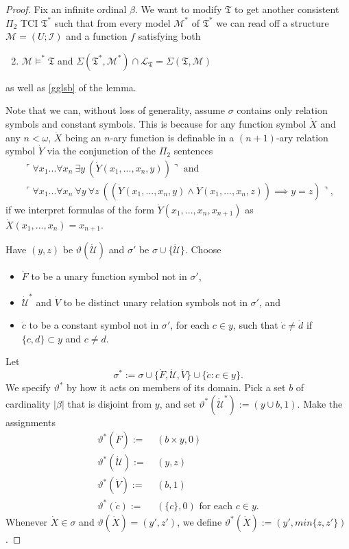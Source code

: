\documentclass[12pt]{article}
\numberwithin{equation}{section}
\begin{document}
\begin{proof}
Fix an infinite ordinal $\beta$. We want to modify $\mathfrak{T}$ to get another consistent $\Pi_2$ TCI $\mathfrak{T}^*$ such that from every model $\mathcal{M}^*$ of $\mathfrak{T}^*$ we can read off a structure $\mathcal{M} = (U; \mathcal{I})$ and a function $f$ satisfying both
\begin{enumerate}[label=(\alph*)']
    \setcounter{enumi}{1}
    \item\label{gglsb'} $\mathcal{M} \models^* \mathfrak{T}$ and $\Sigma(\mathfrak{T}^*, \mathcal{M}^*) \cap \mathcal{L}_{\mathfrak{T}} = \Sigma(\mathfrak{T}, \mathcal{M})$
\end{enumerate}
as well as \ref{gglsb} of the lemma. 

Note that we can, without loss of generality, assume $\sigma$ contains only relation symbols and constant symbols. This is because for any function symbol $\dot{X}$ and any $n < \omega$, $\dot{X}$ being an $n$-ary function is definable in a $(n+1)$-ary relation symbol $\dot{Y}$ via the conjunction of the $\Pi_2$ sentences
\begin{gather*}
    \ulcorner \forall x_1 ... \forall x_n \ \exists y \ (\dot{Y}(x_1, ..., x_n, y)) \urcorner \text{ and} \\
    \ulcorner \forall x_1 ... \forall x_n \ \forall y \ \forall z \ ((\dot{Y} (x_1, ..., x_n, y) \wedge \dot{Y} (x_1, ..., x_n, z)) \implies y = z) \urcorner \text{,} 
\end{gather*}
if we interpret formulas of the form $\dot{Y} (x_1, ..., x_n, x_{n+1})$ as $\dot{X} (x_1, ..., x_n) = x_{n+1}$.

Have $(y, z)$ be $\vartheta(\dot{\mathcal{U}})$ and $\sigma'$ be $\sigma \cup \{\dot{\mathcal{U}}\}$. Choose 
\begin{itemize}
    \item $\dot{F}$ to be a unary function symbol not in $\sigma'$,
    \item $\dot{\mathcal{U}}^*$ and $\dot{V}$ to be distinct unary relation symbols not in $\sigma'$, and
    \item $\dot{c}$ to be a constant symbol not in $\sigma'$, for each $c \in y$, such that $\dot{c} \neq \dot{d}$ if $\{c, d\} \subset y$ and $c \neq d$.
\end{itemize}
Let $$\sigma^* := \sigma \cup \{\dot{F}, \dot{\mathcal{U}}, \dot{V}\} \cup \{\dot{c} : c \in y\}.$$ We specify $\vartheta^*$ by how it acts on members of its domain. Pick a set $b$ of cardinality $|\beta|$ that is disjoint from $y$, and set $\vartheta^*(\dot{\mathcal{U}}^*) := (y \cup b, 1)$. Make the assignments
\begin{align*}
    \vartheta^*(\dot{F}) := \ & (b \times y, 0) \\
    \vartheta^*(\dot{\mathcal{U}}) := \ & (y, z) \\
    \vartheta^*(\dot{V}) := \ & (b, 1) \\
    \vartheta^*(\dot{c}) := \ & (\{c\}, 0) \text{ for each } c \in y \text{.}
\end{align*}
Whenever $\dot{X} \in \sigma$ and $\vartheta(\dot{X}) = (y', z')$, we define $\vartheta^*(\dot{X}) := (y', min\{z, z'\})$.


\end{proof}
\end{document}
